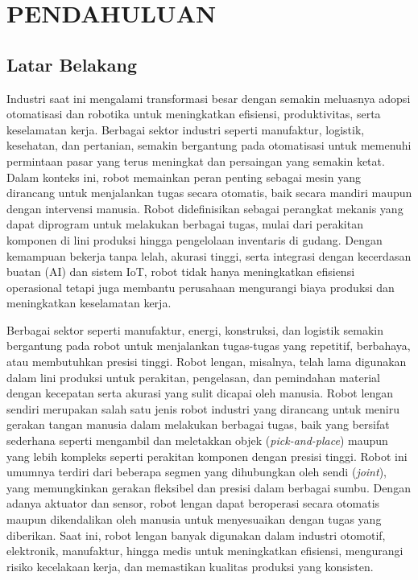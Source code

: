 \chapter{PENDAHULUAN}

\section{Latar Belakang}

Industri saat ini mengalami transformasi besar dengan semakin meluasnya adopsi otomatisasi
dan robotika untuk meningkatkan efisiensi, produktivitas, serta keselamatan kerja\parencite{Miftachul_podrded}.
Berbagai sektor industri seperti manufaktur, logistik, kesehatan, dan pertanian, semakin bergantung pada otomatisasi
untuk memenuhi permintaan pasar yang terus meningkat dan persaingan yang semakin ketat.
Dalam konteks ini, robot memainkan peran penting sebagai mesin yang dirancang untuk
menjalankan tugas secara otomatis, baik secara mandiri maupun dengan intervensi manusia.
Robot didefinisikan sebagai perangkat mekanis yang dapat diprogram untuk melakukan berbagai tugas,
mulai dari perakitan komponen di lini produksi hingga pengelolaan inventaris di gudang.
Dengan kemampuan bekerja tanpa lelah, akurasi tinggi, serta integrasi dengan kecerdasan buatan (AI)
dan sistem IoT, robot tidak hanya meningkatkan efisiensi operasional tetapi juga
membantu perusahaan mengurangi biaya produksi dan meningkatkan keselamatan kerja.

Berbagai sektor seperti manufaktur, energi, konstruksi, dan logistik semakin bergantung pada robot
untuk menjalankan tugas-tugas yang repetitif, berbahaya, atau membutuhkan presisi tinggi\parencite{WenhuaYuan_rotifiraotsocimgvc}.
Robot lengan, misalnya, telah lama digunakan dalam lini produksi untuk perakitan, pengelasan,
dan pemindahan material dengan kecepatan serta akurasi yang sulit dicapai oleh manusia.
Robot lengan sendiri merupakan salah satu jenis robot industri yang dirancang untuk
meniru gerakan tangan manusia dalam melakukan berbagai tugas, baik yang bersifat sederhana
seperti mengambil dan meletakkan objek (\emph{pick-and-place}) maupun yang lebih kompleks
seperti perakitan komponen dengan presisi tinggi. Robot ini umumnya terdiri dari beberapa segmen
yang dihubungkan oleh sendi (\emph{joint}), yang memungkinkan gerakan fleksibel dan presisi dalam berbagai sumbu.
Dengan adanya aktuator dan sensor, robot lengan dapat beroperasi secara otomatis maupun dikendalikan
oleh manusia untuk menyesuaikan dengan tugas yang diberikan. Saat ini, robot lengan banyak digunakan
dalam industri otomotif, elektronik, manufaktur, hingga medis untuk meningkatkan efisiensi,
mengurangi risiko kecelakaan kerja, dan memastikan kualitas produksi yang konsisten.

